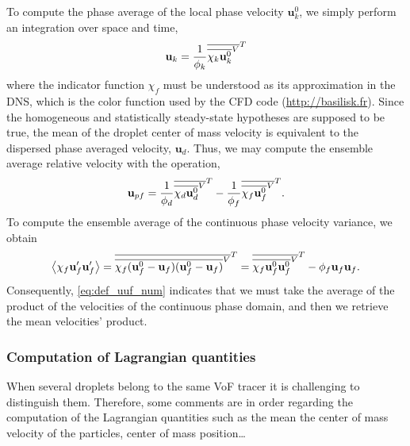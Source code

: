 To compute the phase average of the local phase velocity $\textbf{u}_k^0$, we simply perform an integration over space and time, 
\begin{equation}
    \textbf{u}_k = \frac{1}{\phi_k} \overline{\overline{\chi_k \textbf{u}_k^0}^V}^T
\end{equation}
where the indicator function $\chi_f$ must be understood as its approximation in the DNS, which is the color function used by the CFD code (\url{http://basilisk.fr}). 
Since the homogeneous and statistically steady-state hypotheses are supposed to be true, the mean of the droplet center of mass velocity is equivalent to the dispersed phase averaged velocity, $\textbf{u}_d$.
Thus, we may compute the ensemble average relative velocity with the operation, 
\begin{equation}
    \textbf{u}_{pf} = 
    \frac{1}{\phi_d} \overline{\overline{\chi_d \textbf{u}_d^0}^V}^T
    - \frac{1}{\phi_f} \overline{\overline{\chi_f \textbf{u}_f^0}^V}^T. 
\end{equation} 
To compute the ensemble average of the continuous phase velocity variance, we obtain
\begin{equation}
    \avg{\chi_f\textbf{u}_f' \textbf{u}_f'}
    = \Tavg{\Xavg{\chi_f (\textbf{u}_f^0 -\textbf{u}_f ) (\textbf{u}_f^0 -\textbf{u}_f)}}
    = \Tavg{\Xavg{\chi_f \textbf{u}_f^0 \textbf{u}_f^0}}
    -  \phi_f  \textbf{u}_f \textbf{u}_f.
    \label{eq:def_uuf_num} 
\end{equation}
Consequently, \ref{eq:def_uuf_num} indicates that we must take the average of the product of the velocities of the continuous phase domain, and then we retrieve the mean velocities' product.  

\subsubsection{Computation of Lagrangian quantities}

When several droplets belong to the same VoF tracer it is challenging to distinguish them.
Therefore, some comments are in order regarding the computation of the Lagrangian quantities such as the mean the center of mass velocity of the particles, center of mass position\ldots   

